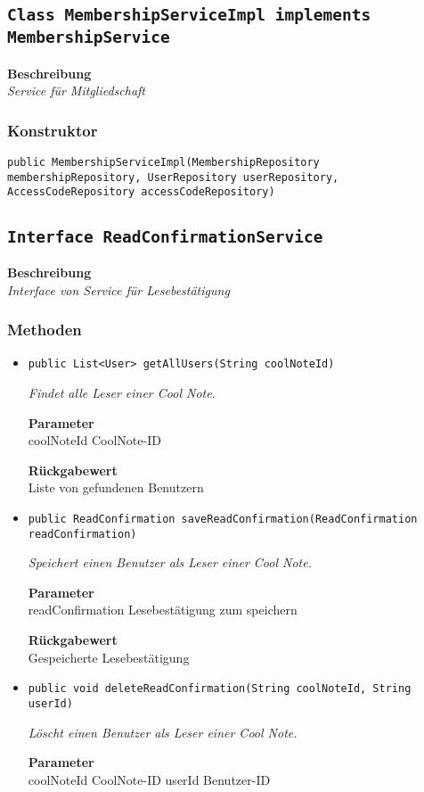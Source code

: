     \subsection{\texttt{Class MembershipServiceImpl implements MembershipService}}
    \textbf{Beschreibung} \\
    \textit{Service für Mitgliedschaft}
    \subsubsection{Konstruktor}
    \texttt{public MembershipServiceImpl(MembershipRepository membershipRepository, UserRepository userRepository, AccessCodeRepository accessCodeRepository)}
    \subsection{\texttt{Interface ReadConfirmationService}}
    \textbf{Beschreibung} \\
    \textit{Interface von Service für Lesebestätigung}
    \subsubsection{Methoden}
    \begin{itemize}
    	\item{\texttt{public List<User> getAllUsers(String coolNoteId)}}
    	
    	\textit{Findet alle Leser einer Cool Note.}
    	
    	\textbf{Parameter} \\
    	coolNoteId CoolNote-ID
    	
    	\textbf{Rückgabewert} \\
    	Liste von gefundenen Benutzern        \item{\texttt{public ReadConfirmation saveReadConfirmation(ReadConfirmation readConfirmation)}}
    	
    	\textit{Speichert einen Benutzer als Leser einer Cool Note.}
    	
    	\textbf{Parameter} \\
    	readConfirmation Lesebestätigung zum speichern
    	
    	\textbf{Rückgabewert} \\
    	Gespeicherte Lesebestätigung        \item{\texttt{public void deleteReadConfirmation(String coolNoteId, String userId)}}
    	
    	\textit{Löscht einen Benutzer als Leser einer Cool Note.}
    	
    	\textbf{Parameter} \\
    	coolNoteId CoolNote-ID
    	userId Benutzer-ID
    	
    	
    \end{itemize}
